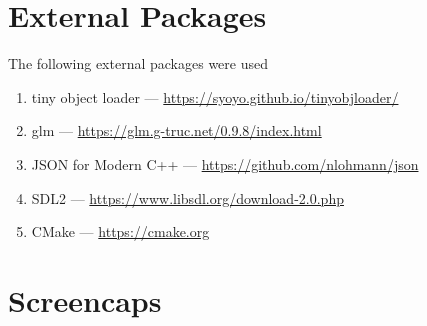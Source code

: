 \section{External Packages}
The following external packages were used 
\begin{enumerate}
    \item tiny object loader --- \url{https://syoyo.github.io/tinyobjloader/}
    \item glm --- \url{https://glm.g-truc.net/0.9.8/index.html}
    \item JSON for Modern C++ --- \url{https://github.com/nlohmann/json}
    \item SDL2 --- \url{https://www.libsdl.org/download-2.0.php}
    \item CMake --- \url{https://cmake.org}
\end{enumerate}

\section{Screencaps}

